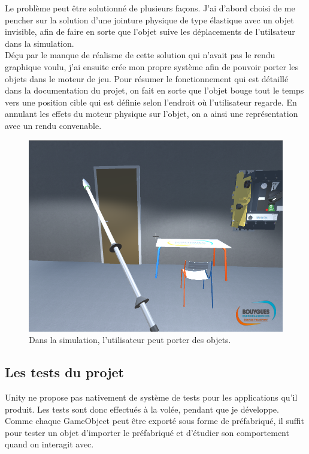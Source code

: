 \documentclass[a4paper]{article}
\begin{document}
    Le problème peut être solutionné de plusieurs façons. J'ai d'abord choisi de me pencher sur la solution d'une jointure physique de type élastique avec un objet invisible, afin de faire en sorte que l'objet suive les déplacements de l'utilsateur dans la simulation. \\

    Déçu par le manque de réalisme de cette solution qui n'avait pas le rendu graphique voulu, j'ai ensuite crée mon propre système afin de pouvoir porter les objets dans le moteur de jeu. Pour résumer le fonctionnement qui est détaillé dans la documentation du projet, on fait en sorte que l'objet bouge tout le temps vers une position cible qui est définie selon l'endroit où l'utilisateur regarde. En annulant les effets du moteur physique sur l'objet, on a ainsi une représentation avec un rendu convenable. \\

    \begin{figure}[H]
        \centering
        \includegraphics[scale=0.5]{img/SimulPorterObjet}
        \caption{Dans la simulation, l'utilisateur peut porter des objets.}
    \end{figure}

    \vfill

    \subsection{Les tests du projet}

    Unity ne propose pas nativement de système de tests pour les applications qu'il produit. Les tests sont donc effectués à la volée, pendant que je développe. Comme chaque GameObject peut être exporté sous forme de préfabriqué, il suffit pour tester un objet d'importer le préfabriqué et d'étudier son comportement quand on interagit avec.\\
\end{document}
